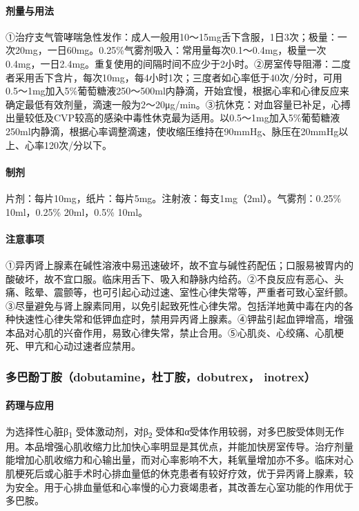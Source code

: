 \paragraph{剂量与用法}

①治疗支气管哮喘急性发作：成人一般用10～15mg舌下含服，1日3次；极量：一次20mg，一日60mg。0.25\%气雾剂吸入：常用量每次0.1～0.4mg，极量一次0.4mg，一日2.4mg。重复使用的间隔时间不应少于2小时。②房室传导阻滞：二度者采用舌下含片，每次10mg，每4小时1次；三度者如心率低于40次/分时，可用0.5～1mg加入5\%葡萄糖液250～500ml内静滴，开始宜慢，根据心率和心律反应来确定最低有效剂量，滴速一般为2～20μg/min。③抗休克：对血容量已补足，心搏出量较低及CVP较高的感染中毒性休克最为适用。以0.5～1mg加入5\%葡萄糖液250ml内静滴，根据心率调整滴速，使收缩压维持在90mmHg、脉压在20mmHg以上、心率120次/分以下。

\paragraph{制剂}

片剂：每片10mg，纸片：每片5mg。注射液：每支1mg（2ml）。气雾剂：0.25\%
10ml，0.25\% 20ml，0.5\% 10ml。

\paragraph{注意事项}

①异丙肾上腺素在碱性溶液中易迅速破坏，故不宜与碱性药配伍；口服易被胃内的酸破坏，故不宜口服。临床用舌下、吸入和静脉内给药。②不良反应有恶心、头痛、眩晕、震颤等，也可引起心动过速、室性心律失常等，严重者可致心室纤颤。③尽量避免与肾上腺素同用，以免引起致死性心律失常。包括洋地黄中毒在内的各种快速性心律失常和低钾血症时，禁用异丙肾上腺素。④钾盐引起血钾增高，增强本品对心肌的兴奋作用，易致心律失常，禁止合用。⑤心肌炎、心绞痛、心肌梗死、甲亢和心动过速者应禁用。

\subsubsection{多巴酚丁胺（dobutamine，杜丁胺，dobutrex， inotrex）}

\paragraph{药理与应用}

为选择性心脏β\textsubscript{1} 受体激动剂，对β\textsubscript{2}
受体和α受体作用较弱，对多巴胺受体则无作用。本品增强心肌收缩力比加快心率明显是其优点，并能加快房室传导。治疗剂量能增加心肌收缩力和心输出量，而对心率影响不大，耗氧量增加亦不多。临床对心肌梗死后或心脏手术时心排血量低的休克患者有较好疗效，优于异丙肾上腺素，较为安全。用于心排血量低和心率慢的心力衰竭患者，其改善左心室功能的作用优于多巴胺。

